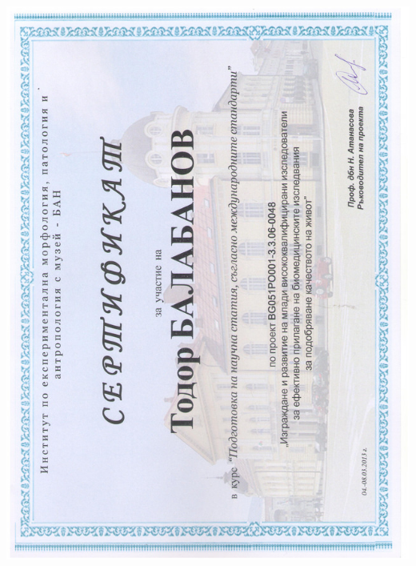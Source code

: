\documentclass[bulgarian,a4paper]{europasscv}
\begin{document}
\includegraphics[width=\textwidth,height=\textheight,keepaspectratio]{IEMPAM2013_4}
\end{document}
